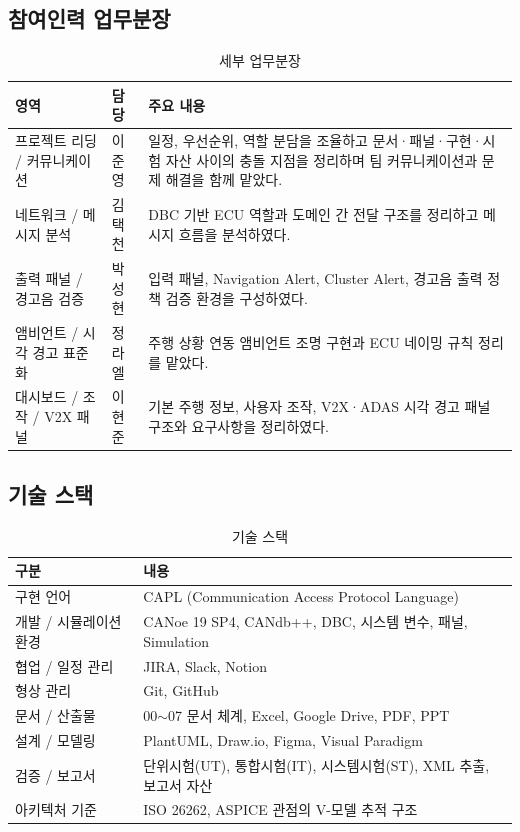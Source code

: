 \documentclass[11pt,a4paper]{article}
\begin{document}
\subsection{참여인력 업무분장}
\begin{table}[H]
\centering
\begin{tabularx}{\textwidth}{|p{28mm}|p{30mm}|X|}
\hline
\textbf{영역} & \textbf{담당} & \textbf{주요 내용} \\ \hline
프로젝트 리딩 / 커뮤니케이션 & 이준영 & 일정, 우선순위, 역할 분담을 조율하고 문서·패널·구현·시험 자산 사이의 충돌 지점을 정리하며 팀 커뮤니케이션과 문제 해결을 함께 맡았다. \\ \hline
네트워크 / 메시지 분석 & 김택천 & DBC 기반 ECU 역할과 도메인 간 전달 구조를 정리하고 메시지 흐름을 분석하였다. \\ \hline
출력 패널 / 경고음 검증 & 박성현 & 입력 패널, Navigation Alert, Cluster Alert, 경고음 출력 정책 검증 환경을 구성하였다. \\ \hline
앰비언트 / 시각 경고 표준화 & 정라엘 & 주행 상황 연동 앰비언트 조명 구현과 ECU 네이밍 규칙 정리를 맡았다. \\ \hline
대시보드 / 조작 / V2X 패널 & 이현준 & 기본 주행 정보, 사용자 조작, V2X·ADAS 시각 경고 패널 구조와 요구사항을 정리하였다. \\ \hline
\end{tabularx}
\caption{세부 업무분장}
\end{table}

\subsection{기술 스택}
\begin{table}[H]
\centering
\begin{tabularx}{\textwidth}{|p{34mm}|X|}
\hline
\textbf{구분} & \textbf{내용} \\ \hline
구현 언어 & CAPL (Communication Access Protocol Language) \\ \hline
개발 / 시뮬레이션 환경 & CANoe 19 SP4, CANdb++, DBC, 시스템 변수, 패널, Simulation \\ \hline
협업 / 일정 관리 & JIRA, Slack, Notion \\ \hline
형상 관리 & Git, GitHub \\ \hline
문서 / 산출물 & 00$\sim$07 문서 체계, Excel, Google Drive, PDF, PPT \\ \hline
설계 / 모델링 & PlantUML, Draw.io, Figma, Visual Paradigm \\ \hline
검증 / 보고서 & 단위시험(UT), 통합시험(IT), 시스템시험(ST), XML 추출, 보고서 자산 \\ \hline
아키텍처 기준 & ISO 26262, ASPICE 관점의 V-모델 추적 구조 \\ \hline
\end{tabularx}
\caption{기술 스택}
\end{table}
\end{document}
